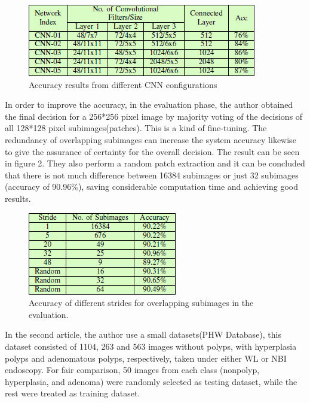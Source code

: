\documentclass[10pt,twocolumn,letterpaper]{article}
\begin{document}
\begin{figure}[t]
	\begin{center}
		\includegraphics[width=0.8\linewidth]{Pic/4.png}
	\end{center}
	\caption{Accuracy results from different CNN configurations}
	\label{fig:long}
	\label{fig:onecol}
\end{figure}

In order to improve the accuracy, in the evaluation phase, the author obtained the final decision for a 256*256 pixel image by majority voting of the decisions of all 128*128 pixel subimages(patches). This is a kind of fine-tuning. The redundancy of overlapping subimages can increase the system accuracy likewise to give the assurance of certainty for the overall decision. The result can be seen in figure 2. They also perform a random patch extraction and it can be concluded that there is not much difference between 16384 subimages or
just 32 subimages (accuracy of 90.96\%), saving considerable computation time and achieving good results.

\begin{figure}[t]
	\begin{center}
		\includegraphics[width=0.8\linewidth]{Pic/5.png}
	\end{center}
	\caption{Accuracy of different strides for overlapping subimages in the evaluation.}
	\label{fig:long}
	\label{fig:onecol}
\end{figure}

In the second article\cite{zhang2017automatic}, the author use a small datasets(PHW Database), this dataset consisted of 1104, 263 and
563 images without polyps, with hyperplasia polyps and adenomatous polyps, respectively, taken under either WL or NBI endoscopy. For fair comparison, 50 images from each class (nonpolyp, hyperplasia, and adenoma) were randomly selected as testing dataset, while the rest were treated as training dataset.
\end{document}
